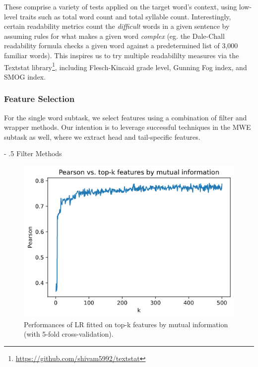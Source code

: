 \documentclass[11pt,a4paper]{article}
\makeatletter
\renewcommand\paragraph{%
    \@startsection{paragraph}{4}{0mm}%
        {-\baselineskip}%
        {.5\baselineskip}%
        {\normalfont\normalsize\bfseries}}
\makeatother
\begin{document}
These comprise a variety of tests applied on the target word's context, using low-level traits such as total word count and total syllable count. Interestingly, certain readability metrics count the \textit{difficult} words in a given sentence by assuming rules for what makes a given word \textit{complex} (eg. the Dale-Chall readability formula \citep{10.2307/1473169} checks a given word against a predetermined list of 3,000 familiar words). This inspires us to try multiple readabililty measures via the Textstat library\footnote{\url{https://github.com/shivam5992/textstat}}, including Flesch-Kincaid grade level, Gunning Fog index, and SMOG index.

\subsubsection{Feature Selection}

For the single word subtask, we select features using a combination of filter and wrapper methods. Our intention is to leverage successful techniques in the MWE subtask as well, where we extract head and tail-specific features.

\paragraph{Filter Methods}

\begin{figure}
  \centering
  \includegraphics[scale=0.4]{mi.png}
  \caption{\label{fig:mi} Performances of LR fitted on top-k features by mutual information (with 5-fold cross-validation).}
\end{figure}
\end{document}
